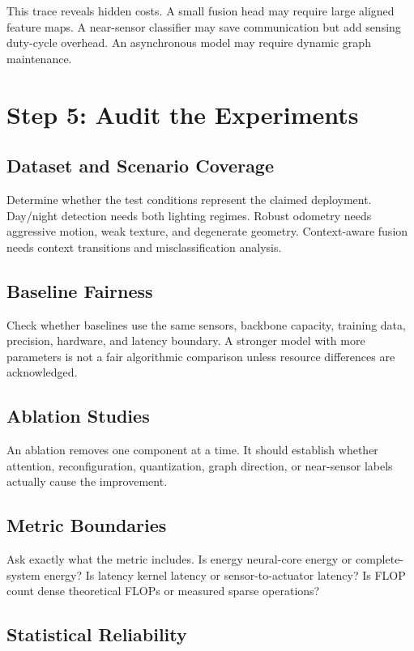 This trace reveals hidden costs. A small fusion head may require large aligned feature maps. A near-sensor classifier may save communication but add sensing duty-cycle overhead. An asynchronous model may require dynamic graph maintenance.

\section{Step 5: Audit the Experiments}

\subsection{Dataset and Scenario Coverage}

Determine whether the test conditions represent the claimed deployment. Day/night detection needs both lighting regimes. Robust odometry needs aggressive motion, weak texture, and degenerate geometry. Context-aware fusion needs context transitions and misclassification analysis.

\subsection{Baseline Fairness}

Check whether baselines use the same sensors, backbone capacity, training data, precision, hardware, and latency boundary. A stronger model with more parameters is not a fair algorithmic comparison unless resource differences are acknowledged.

\subsection{Ablation Studies}

An ablation removes one component at a time. It should establish whether attention, reconfiguration, quantization, graph direction, or near-sensor labels actually cause the improvement.

\subsection{Metric Boundaries}

Ask exactly what the metric includes. Is energy neural-core energy or complete-system energy? Is latency kernel latency or sensor-to-actuator latency? Is FLOP count dense theoretical FLOPs or measured sparse operations?

\subsection{Statistical Reliability}

